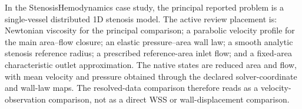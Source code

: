 \begin{stenosisillustration}
\label{ex:stenosisillustration-modeling-closures}
In the StenosisHemodynamics case study, the principal reported problem is a
single-vessel distributed 1D stenosis model. The active review placement is:
Newtonian viscosity for the principal comparison; a parabolic velocity profile
for the main area--flow closure; an elastic pressure--area wall law; a smooth
analytic stenosis reference radius; a prescribed reference-area inlet flow; and
a fixed-area characteristic outlet approximation. The native states are reduced
area and flow, with mean velocity and pressure obtained through the declared
solver-coordinate and wall-law maps. The resolved-data comparison therefore
reads as a velocity-observation comparison, not as a direct WSS or
wall-displacement comparison.
\end{stenosisillustration}
